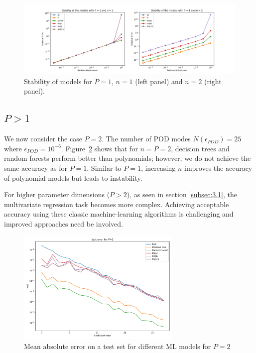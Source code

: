 \documentclass[graybox]{svmult}
\begin{document}
\begin{figure}[!hb]
    \centering
\includegraphics[width=1.0\textwidth] {img-stabP1.png}
    \caption{Stability of models for $P=1$, $n=1$ (left panel) and $n=2$ (right panel).}
    \label{fig:stabP1}
\end{figure}


\subsection{$P>1$}
\label{subsec:4.2}
We now consider the case $P=2$. The number of POD modes $N(\epsilon_{POD})=25$ where $\epsilon_{POD}=10^{-6}$. Figure~\ref{fig:MLP2} shows that for $n=P=2$, decision trees and random forests perform better than polynomials; however, we do not achieve the same accuracy as for $P=1$. Similar to $P=1$, increasing $n$ improves the accuracy of polynomial models but leads to instability.

For higher parameter dimensions ($P>2$), as seen in section \ref{subsec:3.1}, the multivariate regression task becomes more complex. Achieving acceptable accuracy using these classic machine-learning algorithms is challenging and improved approaches need be involved.

\begin{figure}[!hb]
    \centering
\includegraphics[width=0.7\textwidth] {img-MLP2.png}
   \caption{Mean absolute error on a test set for different ML models for $P=2$}
    \label{fig:MLP2}
\end{figure}
\end{document}
